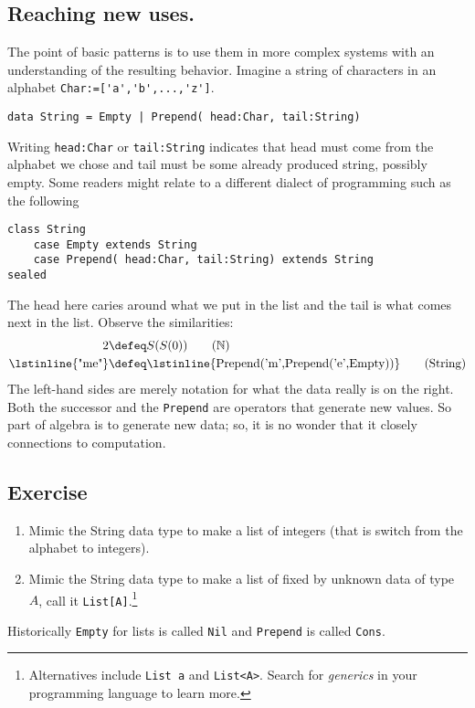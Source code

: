 \subsection{Reaching new uses.}

The point of basic patterns is to use them in more complex systems
with an understanding of the resulting behavior.  Imagine a string 
of characters in an alphabet \lstinline{Char:=['a','b',...,'z']}.
\begin{lstlisting}[language=Hidris]
data String = Empty | Prepend( head:Char, tail:String) 
\end{lstlisting}
Writing \lstinline{head:Char} or \lstinline{tail:String} 
indicates that head must come from the alphabet we chose 
and tail must be some already produced string, possibly empty.
Some readers might relate to a different dialect of 
programming such as the following
\begin{lstlisting}[language=Sava]
class String
    case Empty extends String
    case Prepend( head:Char, tail:String) extends String
sealed
\end{lstlisting}
The head here caries around what we put in the list and the tail 
is what comes next in the list.  Observe the similarities:
\begin{align}
     2 & \defeq S(S(0)) \tag{$\mathbb{N}$}\\
 \text{\lstinline{"me"}} & \defeq \text{\lstinline{Prepend('m',Prepend('e',Empty))}}
\tag{String}
\end{align}
The left-hand sides are merely notation for what the data really is on the right.
Both the successor and the \lstinline{Prepend} are operators that generate 
new values.  So part of algebra is to generate new data; so, it is no wonder 
that it closely connections to computation.

\subsection*{Exercise}
\begin{enumerate}
    \item Mimic the String data type to make a list of integers (that is 
    switch from the alphabet to integers).

    \item Mimic the String data type to make a list of fixed by 
    unknown data of type $A$, call it \lstinline{List[A]}.\footnote{
    Alternatives include \lstinline{List a} and \lstinline{List<A>}. 
    Search for \emph{generics} in your programming language to learn more.
    }

\end{enumerate}
Historically \lstinline{Empty} for lists is called \lstinline{Nil} 
and \lstinline{Prepend} is called \lstinline{Cons}.



